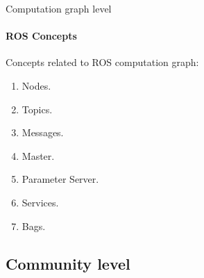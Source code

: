 \documentclass{beamer}
\begin{document}
\begin{frame}{Computation graph level}
    \framesubtitle{ROS Concepts}
    
    Concepts related to ROS computation graph:
    
    \begin{enumerate}
        \item \textcolor{black!40}{Nodes.}
        \item \textcolor{black!40}{Topics.}
        \item \textcolor{black!40}{Messages.}
        \item \textcolor{black!40}{Master.}
        \item Parameter Server.
        \item Services.
        \item Bags.
    \end{enumerate}
\end{frame}

    
\subsection{Community level}
\end{document}

